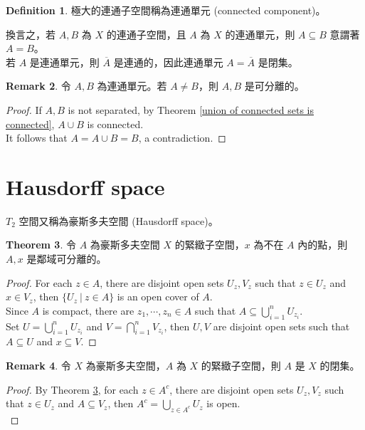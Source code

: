 \documentclass[12pt]{article}
\theoremstyle{definition}
\newtheorem{definition}{Definition}[section]
\newtheorem{theorem}[definition]{Theorem}
\newtheorem{remark}[definition]{Remark}
\newcommand\<{\langle}
\renewcommand\>{\rangle}
\begin{document}
\begin{CJK}{UTF8}{bsmi}
\begin{definition}
    極大的連通子空間稱為連通單元 (connected component)。
\end{definition}

換言之，若 $A, B$ 為 $X$ 的連通子空間，且 $A$ 為 $X$ 的連通單元，則 $A\subseteq B$ 意謂著 $A=B$。 \\

若 $A$ 是連通單元，則 $\overline{A}$ 是連通的，因此連通單元 $A=\overline{A}$ 是閉集。

\begin{remark}
    令 $A, B$ 為連通單元。若 $A\ne B$，則 $A, B$ 是可分離的。 
\end{remark}
\begin{proof}
    If $A, B$ is not separated, by Theorem \ref{union of connected sets is connected}, $A\cup B$ is connected. \\
    It follows that $A=A\cup B=B$, a contradiction.
\end{proof}

\section{Hausdorff space}

$T_2$ 空間又稱為豪斯多夫空間 (Hausdorff space)。

\begin{theorem}
\label{compact, point are seperated by open sets}
    令 $A$ 為豪斯多夫空間 $X$ 的緊緻子空間，$x$ 為不在 $A$ 內的點，則 $A, x$ 是鄰域可分離的。
\end{theorem}
\begin{proof}
    For each $z\in A$, there are disjoint open sets $U_z, V_z$ such that $z\in U_z$ and $x\in V_z$, then $\{U_z\ |\ z\in A\}$ is an open cover of $A$. \\
    Since $A$ is compact, there are $z_1, \cdots, z_n\in A$ such that $A\subseteq\bigcup_{i=1}^n U_{z_i}$. \\
    Set $U=\bigcup_{i=1}^n U_{z_i}$ and $V=\bigcap_{i=1}^n V_{z_i}$, then $U, V$ are disjoint open sets such that $A\subseteq U$ and $x\subseteq V$.
\end{proof}

\begin{remark}
    令 $X$ 為豪斯多夫空間，$A$ 為 $X$ 的緊緻子空間，則 $A$ 是 $X$ 的閉集。
\end{remark}
\begin{proof}
    By Theorem \ref{compact, point are seperated by open sets}, for each $z\in A^c$, there are disjoint open sets $U_z, V_z$ such that $z\in U_z$ and $A\subseteq V_z$, then $A^c=\bigcup_{z\in A^c}U_z$ is open. \\
\end{proof}


\end{CJK}
\end{document}
